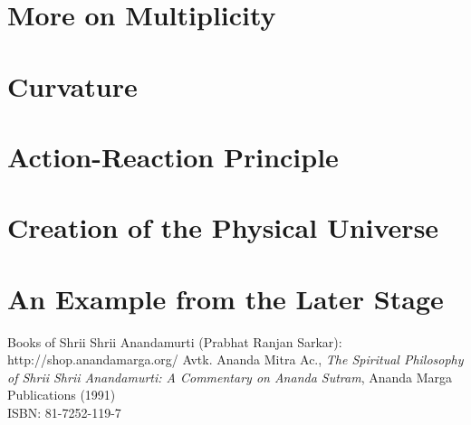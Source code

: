 \documentclass[12pt]{book}
\begin{document}
\chapter*{More on Multiplicity}
\chapter*{Curvature}
\chapter*{Action-Reaction Principle}
\chapter*{Creation of the Physical Universe}
\chapter*{An Example from the Later Stage}
%
%
\backmatter
%
\begin{thebibliography}{99}
%
Books of Shrii Shrii Anandamurti (Prabhat Ranjan Sarkar): http://shop.anandamarga.org/
Avtk. Ananda Mitra Ac., \emph{The Spiritual Philosophy of Shrii Shrii Anandamurti: A Commentary on Ananda Sutram}, Ananda Marga Publications (1991) \\
ISBN: 81-7252-119-7
%
\end{thebibliography}
%
\end{document}

